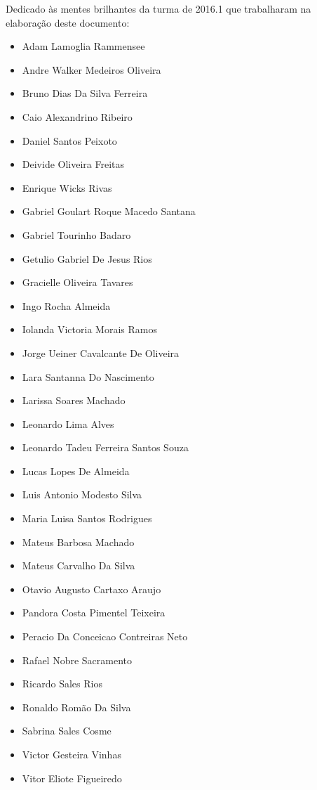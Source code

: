 \begin{dedication}
Dedicado às mentes brilhantes da turma de 2016.1 que trabalharam na elaboração deste documento:

\begin{itemize}
\setlength\itemsep{0em}
\item Adam Lamoglia Rammensee
\item Andre Walker Medeiros Oliveira
\item Bruno Dias Da Silva Ferreira
\item Caio Alexandrino Ribeiro
\item Daniel Santos Peixoto
\item Deivide Oliveira Freitas
\item Enrique Wicks Rivas
\item Gabriel Goulart Roque Macedo Santana
\item Gabriel Tourinho Badaro
\item Getulio Gabriel De Jesus Rios
\item Gracielle Oliveira Tavares
\item Ingo Rocha Almeida
\item Iolanda Victoria Morais Ramos
\item Jorge Ueiner Cavalcante De Oliveira
\item Lara Santanna Do Nascimento
\item Larissa Soares Machado
\item Leonardo Lima Alves
\item Leonardo Tadeu Ferreira Santos Souza
\item Lucas Lopes De Almeida
\item Luis Antonio Modesto Silva
\item Maria Luisa Santos Rodrigues
\item Mateus Barbosa Machado
\item Mateus Carvalho Da Silva
\item Otavio Augusto Cartaxo Araujo
\item Pandora Costa Pimentel Teixeira
\item Peracio Da Conceicao Contreiras Neto
\item Rafael Nobre Sacramento
\item Ricardo Sales Rios
\item Ronaldo Romão Da Silva
\item Sabrina Sales Cosme
\item Victor Gesteira Vinhas
\item Vitor Eliote Figueiredo
\end{itemize}
\end{dedication}


